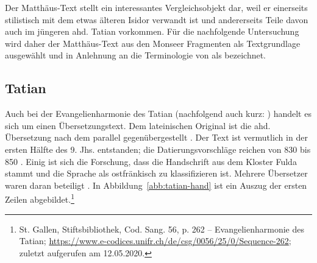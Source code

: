 


Der Matthäus-Text stellt ein interessantes Vergleichsobjekt dar, weil er  einerseits stilistisch mit dem etwas älteren Isidor verwandt ist \parencite{Hench1893,Lippert1974} und andererseits Teile davon auch im jüngeren ahd. Tatian vorkommen. Für die nachfolgende Untersuchung wird daher der Matthäus-Text aus den Monseer Fragmenten als Textgrundlage ausgewählt und in Anlehnung an die Terminologie von \textcite{Lippert1974} als  bezeichnet.
  
\subsection{Tatian}\label{sec:tatian}

Auch bei der Evangelienharmonie des Tatian (nachfolgend auch kurz: ) handelt es sich um einen Übersetzungstext. Dem lateinischen Original ist die ahd. Übersetzung nach dem  \parencite[43]{Fleischer2011} parallel gegenübergestellt \parencite[vgl. hierzu auch][128]{Masser1997}. Der Text ist vermutlich in der ersten Hälfte des 9. Jhs. entstanden; die Datierungsvorschläge reichen von 830 \parencite[LXX]{Sievers1961} bis 850 \parencite[127]{Sonderegger2003}. Einig ist sich die Forschung, dass die Handschrift aus dem Kloster Fulda stammt und die Sprache als ostfränkisch zu klassifizieren ist. Mehrere Übersetzer waren daran beteiligt \parencite[s.][31]{Masser1994}. In Abbildung~\ref{abb:tatian-hand} ist ein Auszug der ersten Zeilen abgebildet.\footnote{St. Gallen, Stiftsbibliothek, Cod. Sang. 56, p. 262 –
Evangelienharmonie des Tatian; \url{https://www.e-codices.unifr.ch/de/csg/0056/25/0/Sequence-262}; zuletzt aufgerufen am 12.05.2020.}

